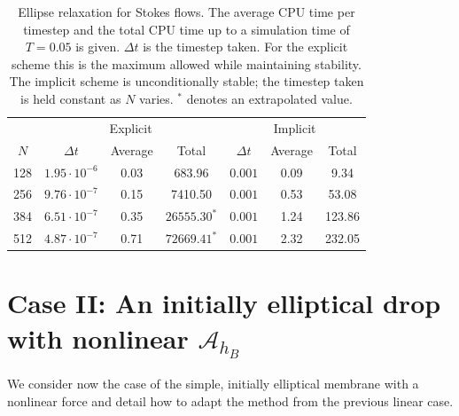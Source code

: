 \documentclass[preprint,12pt]{elsarticle}
\begin{document}
\begin{table}
\caption{Ellipse relaxation for Stokes flows. The average CPU time per timestep and the total CPU time up to a simulation time of 
$T=0.05$ is given. $\Delta t$ is the timestep taken. For the explicit scheme this is the maximum allowed while maintaining stability. The implicit scheme is unconditionally stable; the timestep taken is held constant as $N$ varies.  $^*$ denotes an extrapolated value.}
\label{table:EllipseStokesSims}
\begin{center}
\begin{tabular}{|c |c c c| c c c|}
\hline
& \multicolumn{3}{|c|}{Explicit} & \multicolumn{3}{|c|}{Implicit}\\
$N$ & $\Delta t$ & Average & Total & $\Delta t$ & Average & Total\\
\hline
128 & $1.95\cdot 10^{-6}$ & 0.03 & 683.96 & $0.001$ & 0.09 & 9.34\\
256 & $9.76\cdot 10^{-7}$ & 0.15 & 7410.50 & $0.001$ & 0.53 &  53.08\\
384 & $6.51\cdot 10^{-7}$ & 0.35 & $26555.30^*$ & $0.001$ & 1.24 & 123.86\\
512 & $4.87\cdot 10^{-7}$ & 0.71 & $72669.41^*$ & $0.001$ & 2.32 & 232.05\\
\hline
\end{tabular}
\end{center}
\end{table}



\section{Case II:   An initially elliptical drop with nonlinear $\mathcal{A}_{h_B}$}
\label{Sec:Nonlinear}
 We consider now the case of the simple, initially elliptical membrane  with a nonlinear force and detail how to adapt the method from the previous linear case.
\end{document}
